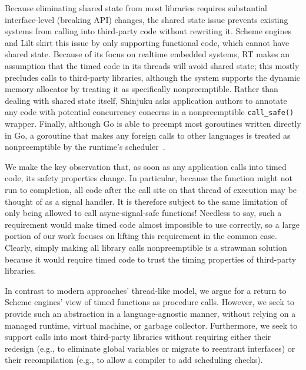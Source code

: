 Because eliminating shared state from most libraries requires substantial
interface-level (breaking API) changes, the shared state issue prevents existing
systems from calling into third-party code without rewriting it.  Scheme engines and
Lilt skirt this issue by only supporting functional code, which cannot have shared
state.  Because of its focus on realtime embedded systems, RT makes an assumption
that the timed code in its threads will avoid shared state; this mostly precludes
calls to third-party libraries, although the system supports the dynamic memory
allocator by treating it as specifically nonpreemptible.  Rather than dealing with
shared state itself, Shinjuku asks application authors to annotate any code with
potential concurrency concerns in a nonpreemptible \texttt{call\_safe()} wrapper.
Finally, although Go is able to preempt most goroutines written directly in Go, a
goroutine that makes any foreign calls to other languages is treated as
nonpreemptible by the runtime's scheduler~\cite{www-golang-fficall}.

We make the key observation that, as soon as any application calls into timed code,
its safety properties change.  In particular, because the function might not run to
completion, all code after the call site on that thread of execution may be thought
of as a signal handler.  It is therefore subject to the same limitation of only being
allowed to call async-signal-safe functions!  Needless to say, such a requirement
would make timed code almost impossible to use correctly, so a large portion of
our work focuses on lifting this requirement in the common case.  Clearly, simply
making all library calls nonpreemptible is a strawman solution because it would
require timed code to trust the timing properties of third-party libraries.

In contrast to modern approaches' thread-like model, we argue for a return to Scheme
engines' view of timed functions as procedure calls.  However, we seek to provide
such an abstraction in a language-agnostic manner, without relying on a managed
runtime, virtual machine, or garbage collector.  Furthermore, we seek to support
calls into most third-party libraries without requiring either their redesign (e.g.,
to eliminate global variables or migrate to reentrant interfaces) or their
recompilation (e.g., to allow a compiler to add scheduling checks).
